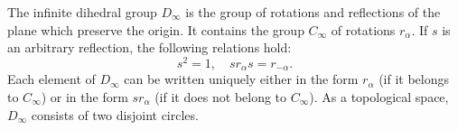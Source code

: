 The infinite dihedral group $D_{\infty}$ is the group of rotations and reflections of the plane which preserve the origin. It contains the group $C_{\infty}$ of rotations $r_{\alpha}$. If $s$ is an arbitrary reflection, the following relations hold:
$$
s^{2} = 1, \quad s r_{\alpha} s = r_{-\alpha}.
$$
Each element of $D_{\infty}$ can be written uniquely either in the form $r_{\alpha}$ (if it belongs to $C_{\infty}$) or in the form $s r_{\alpha}$ (if it does not belong to $C_{\infty}$). As a topological space, $D_{\infty}$ consists of two disjoint circles.
